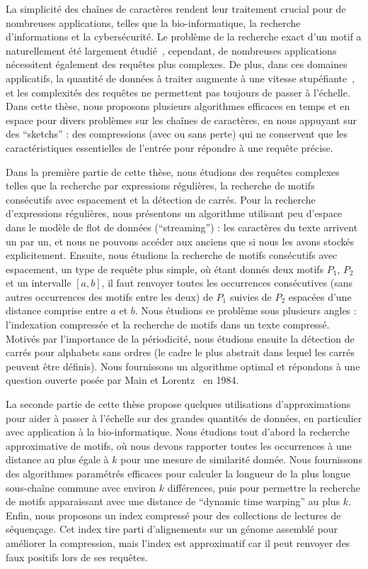 La simplicité des chaînes de caractères rendent leur traitement crucial pour de nombreuses applications, telles que la bio-informatique, la recherche d'informations et la cybersécurité.
Le problème de la recherche exact d'un motif a naturellement été largement étudié~\cite{Charras2004}, cependant, de nombreuses applications nécessitent également des requêtes plus complexes. De plus, dans ces domaines applicatifs, la quantité de données à traiter augmente à une vitesse stupéfiante~\cite{muir2016real}, et les complexités des requêtes ne permettent pas toujours de passer à l'échelle.
Dans cette thèse, nous proposons plusieurs algorithmes efficaces en temps et en espace pour divers problèmes sur les chaînes de caractères, en nous appuyant sur des ``sketchs'' : des compressions (avec ou sans perte) qui ne conservent que les caractéristiques essentielles de l'entrée pour répondre à une requête précise.

Dans la première partie de cette thèse, nous étudions des requêtes complexes telles que la recherche par expressions régulières, la recherche de motifs consécutifs avec espacement et la détection de carrés.
Pour la recherche d'expressions régulières, nous présentons un algorithme utilisant peu d'espace dans le modèle de flot de données (``streaming'') : les caractères du texte arrivent un par un, et nous ne pouvons accéder aux anciens que si nous les avons stockés explicitement.
Ensuite, nous étudions la recherche de motifs consécutifs avec espacement, un type de requête plus simple, où étant donnés deux motifs $P_1$, $P_2$ et un intervalle $[a, b]$, il faut renvoyer toutes les occurrences consécutives (sans autres occurrences des motifs entre les deux) de $P_1$ suivies  de $P_2$ espacées d'une distance comprise entre $a$ et $b$. Nous étudions ce problème sous plusieurs angles : l'indexation compressée et la recherche de motifs dans un texte compressé.
Motivés par l'importance de la périodicité, nous étudions ensuite la détection de carrés pour alphabets sans ordres (le cadre le plus abstrait dans lequel les carrés peuvent être définis). Nous fournissons un algorithme optimal et répondons à une question ouverte posée par Main et Lorentz~\cite{Main1984} en 1984.

La seconde partie de cette thèse propose quelques utilisations d'approximations pour aider à passer à l'échelle sur des grandes quantités de données, en particulier avec application à la bio-informatique.
%
Nous étudions tout d'abord la recherche approximative de motifs, où nous devons rapporter toutes les occurrences à une distance au plus égale à $k$ pour une mesure de similarité donnée.
Nous fournissons des algorithmes paramétrés efficaces pour calculer la longueur de la plus longue sous-chaîne commune avec environ $k$ différences, puis pour permettre la recherche de motifs apparaissant avec une distance de ``dynamic time warping'' au plus $k$.
Enfin, nous proposons un index compressé pour des collections de lectures de séquençage. Cet index tire parti d'alignements sur un génome assemblé pour améliorer la compression, mais l'index est approximatif car il peut renvoyer des faux positifs lors de ses requêtes.